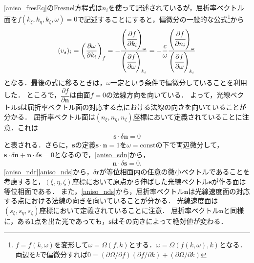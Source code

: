 \eqref{aniso_fresEq}のFresnel方程式は$n_i$を使って記述されているが，屈折率ベクトル面を$f(k_\xi,k_\eta,k_\zeta,\omega)=0$で記述することにすると，偏微分の一般的な公式\footnote{\(f=f(k, \omega)\)を変形して\(\omega=\Omega(f, k)\)とする．\(\omega = \Omega(f(k, \omega), k)\)となる．両辺を\(k\)で偏微分すれば\(0 = (\partial\Omega/\partial f)(\partial f/\partial k) + (\partial\Omega/\partial k)\)}から
\[
(v_s)_i = \left( \dfrac{\partial\omega}{\partial{}k_i} \right)_f
= -\dfrac{\left(\cfrac{\partial{f}}{\partial{}k_i}\right)_\omega}{\left(\cfrac{\partial{}f}{\partial\omega}\right)_{k_i}}
= -\dfrac{c}{\omega}\dfrac{\left(\cfrac{\partial{f}}{\partial{}n_i}\right)_\omega}{\left(\cfrac{\partial{}f}{\partial\omega}\right)_{k_i}}
\]
となる．最後の式に移るときは，$\omega$一定という条件で偏微分していることを利用した．
ところで，$\dfrac{\partial{f}}{\partial\boldsymbol{n}}$は曲面$f=0$の法線方向を向いている．
よって，光線ベクトル$\boldsymbol{s}$は屈折率ベクトル面の対応する点における法線の向きを向いていることが分かる．
屈折率ベクトル面は$(n_\xi,n_\eta,n_\zeta)$座標において定義されていることに注意．これは
\begin{align}
  \boldsymbol{s}\cdot\delta\boldsymbol{n}=0\label{aniso_sdn}
\end{align}
と表される．さらに，$\boldsymbol{s}$の定義$\boldsymbol{s}\cdot\boldsymbol{n}=1$を$\omega=\text{const}$の下で両辺微分して，
$\boldsymbol{s}\cdot\delta\boldsymbol{n}+\boldsymbol{n}\cdot\delta\boldsymbol{s}=0$となるので，\eqref{aniso_sdn}から，
\begin{align}
  \boldsymbol{n}\cdot\delta\boldsymbol{s}=0.\label{aniso_nds}
\end{align}
\eqref{aniso_ndr}\eqref{aniso_nds}から，$\delta\boldsymbol{r}$が等位相面内の任意の微小ベクトルであることを考慮すると，$(\xi,\eta,\zeta)$座標において原点から伸ばした光線ベクトル$\boldsymbol{s}$が作る面は等位相面である．
また，\eqref{aniso_nds}から，屈折率ベクトル$\boldsymbol{n}$は光線速度面の対応する点における法線の向きを向いていることが分かる．
光線速度面は$(s_\xi,s_\eta,s_\zeta)$座標において定義されていることに注意．
屈折率ベクトル$\boldsymbol{n}$と同様に，ある1点を出た光であっても，$\boldsymbol{s}$はその向きによって絶対値が変わる．

